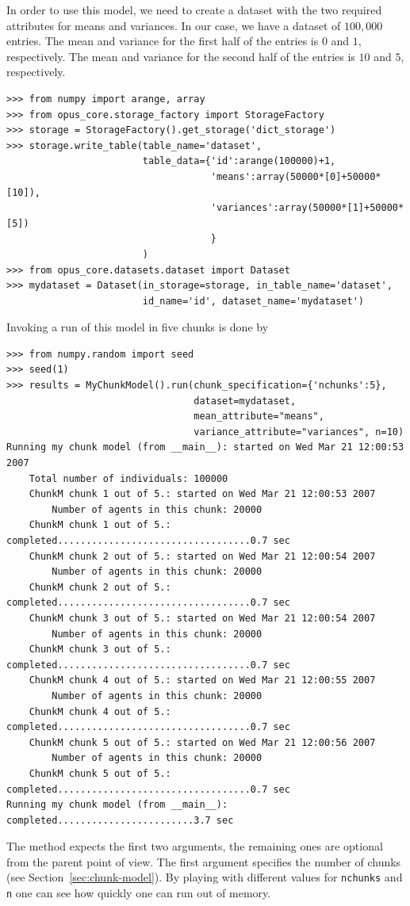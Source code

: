 In order to use this model, we need to create a dataset with the two required attributes for means and variances.
In our case, we have a dataset of $100,000$ entries. The mean and variance for the first half of the entries
is $0$ and $1$, respectively. The mean and variance for the second half of the entries
is $10$ and $5$, respectively.

\begin{verbatim}
>>> from numpy import arange, array
>>> from opus_core.storage_factory import StorageFactory
>>> storage = StorageFactory().get_storage('dict_storage')
>>> storage.write_table(table_name='dataset',
                        table_data={'id':arange(100000)+1,
                                    'means':array(50000*[0]+50000*[10]),
                                    'variances':array(50000*[1]+50000*[5])
                                    }
                        )
>>> from opus_core.datasets.dataset import Dataset
>>> mydataset = Dataset(in_storage=storage, in_table_name='dataset',
                        id_name='id', dataset_name='mydataset')
\end{verbatim}

Invoking a run of this model in five chunks is done by

\begin{verbatim}
>>> from numpy.random import seed
>>> seed(1)
>>> results = MyChunkModel().run(chunk_specification={'nchunks':5},
                                 dataset=mydataset,
                                 mean_attribute="means",
                                 variance_attribute="variances", n=10)
Running my chunk model (from __main__): started on Wed Mar 21 12:00:53 2007
    Total number of individuals: 100000
    ChunkM chunk 1 out of 5.: started on Wed Mar 21 12:00:53 2007
        Number of agents in this chunk: 20000
    ChunkM chunk 1 out of 5.: completed..................................0.7 sec
    ChunkM chunk 2 out of 5.: started on Wed Mar 21 12:00:54 2007
        Number of agents in this chunk: 20000
    ChunkM chunk 2 out of 5.: completed..................................0.7 sec
    ChunkM chunk 3 out of 5.: started on Wed Mar 21 12:00:54 2007
        Number of agents in this chunk: 20000
    ChunkM chunk 3 out of 5.: completed..................................0.7 sec
    ChunkM chunk 4 out of 5.: started on Wed Mar 21 12:00:55 2007
        Number of agents in this chunk: 20000
    ChunkM chunk 4 out of 5.: completed..................................0.7 sec
    ChunkM chunk 5 out of 5.: started on Wed Mar 21 12:00:56 2007
        Number of agents in this chunk: 20000
    ChunkM chunk 5 out of 5.: completed..................................0.7 sec
Running my chunk model (from __main__): completed........................3.7 sec
\end{verbatim}
The  method expects the first two arguments, the remaining ones are optional
from the parent point of view. The first argument specifies the number of chunks (see
Section~\ref{sec:chunk-model}). By playing with different values for \verb|nchunks| and
\verb|n| one can see how quickly one can run out of memory. 

